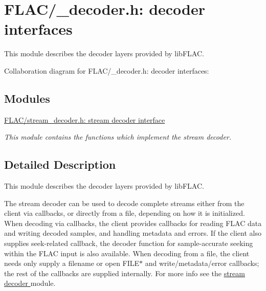 \hypertarget{group__flac__decoder}{}\section{F\+L\+A\+C/\+\_\+decoder.h\+: decoder interfaces}
\label{group__flac__decoder}


This module describes the decoder layers provided by lib\+F\+L\+AC.  


Collaboration diagram for F\+L\+A\+C/\+\_\+decoder.h\+: decoder interfaces\+:
\subsection*{Modules}
\begin{DoxyCompactItemize}
\item 
\hyperlink{group__flac__stream__decoder}{F\+L\+A\+C/stream\+\_\+decoder.\+h\+: stream decoder interface}
\begin{DoxyCompactList}\small\item\em This module contains the functions which implement the stream decoder. \end{DoxyCompactList}\end{DoxyCompactItemize}


\subsection{Detailed Description}
This module describes the decoder layers provided by lib\+F\+L\+AC. 

The stream decoder can be used to decode complete streams either from the client via callbacks, or directly from a file, depending on how it is initialized. When decoding via callbacks, the client provides callbacks for reading F\+L\+AC data and writing decoded samples, and handling metadata and errors. If the client also supplies seek-\/related callback, the decoder function for sample-\/accurate seeking within the F\+L\+AC input is also available. When decoding from a file, the client needs only supply a filename or open {\ttfamily F\+I\+L\+E$\ast$} and write/metadata/error callbacks; the rest of the callbacks are supplied internally. For more info see the \hyperlink{group__flac__stream__decoder}{stream decoder } module. 